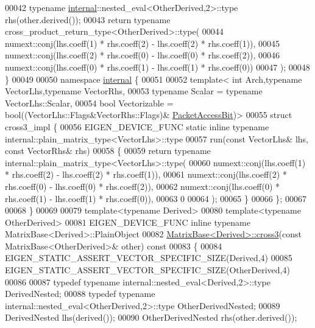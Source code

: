 \begin{DoxyCode}
00042   typename \hyperlink{namespaceinternal}{internal}::nested\_eval<OtherDerived,2>::type rhs(other.derived());
00043   return typename cross\_product\_return\_type<OtherDerived>::type(
00044     numext::conj(lhs.coeff(1) * rhs.coeff(2) - lhs.coeff(2) * rhs.coeff(1)),
00045     numext::conj(lhs.coeff(2) * rhs.coeff(0) - lhs.coeff(0) * rhs.coeff(2)),
00046     numext::conj(lhs.coeff(0) * rhs.coeff(1) - lhs.coeff(1) * rhs.coeff(0))
00047   );
00048 \}
00049 
00050 namespace \hyperlink{namespaceinternal}{internal} \{
00051 
00052 \textcolor{keyword}{template}< \textcolor{keywordtype}{int} Arch,\textcolor{keyword}{typename} VectorLhs,\textcolor{keyword}{typename} VectorRhs,
00053           \textcolor{keyword}{typename} Scalar = \textcolor{keyword}{typename} VectorLhs::Scalar,
00054           \textcolor{keywordtype}{bool} Vectorizable = bool((VectorLhs::Flags&VectorRhs::Flags)&
      \hyperlink{group__flags_ga1a306a438e1ab074e8be59512e887b9f}{PacketAccessBit})>
00055 \textcolor{keyword}{struct }cross3\_impl \{
00056   EIGEN\_DEVICE\_FUNC \textcolor{keyword}{static} \textcolor{keyword}{inline} \textcolor{keyword}{typename} internal::plain\_matrix\_type<VectorLhs>::type
00057   run(\textcolor{keyword}{const} VectorLhs& lhs, \textcolor{keyword}{const} VectorRhs& rhs)
00058   \{
00059     \textcolor{keywordflow}{return} \textcolor{keyword}{typename} internal::plain\_matrix\_type<VectorLhs>::type(
00060       numext::conj(lhs.coeff(1) * rhs.coeff(2) - lhs.coeff(2) * rhs.coeff(1)),
00061       numext::conj(lhs.coeff(2) * rhs.coeff(0) - lhs.coeff(0) * rhs.coeff(2)),
00062       numext::conj(lhs.coeff(0) * rhs.coeff(1) - lhs.coeff(1) * rhs.coeff(0)),
00063       0
00064     );
00065   \}
00066 \};
00067 
00068 \}
00069 
00079 \textcolor{keyword}{template}<\textcolor{keyword}{typename} Derived>
00080 \textcolor{keyword}{template}<\textcolor{keyword}{typename} OtherDerived>
00081 EIGEN\_DEVICE\_FUNC \textcolor{keyword}{inline} \textcolor{keyword}{typename} MatrixBase<Derived>::PlainObject
00082 \hyperlink{group___geometry___module_gaf10988c8393785423ae68a5afdf83226}{MatrixBase<Derived>::cross3}(\textcolor{keyword}{const} MatrixBase<OtherDerived>& other)\textcolor{keyword}{ const}
00083 \textcolor{keyword}{}\{
00084   EIGEN\_STATIC\_ASSERT\_VECTOR\_SPECIFIC\_SIZE(Derived,4)
00085   EIGEN\_STATIC\_ASSERT\_VECTOR\_SPECIFIC\_SIZE(OtherDerived,4)
00086 
00087   typedef typename internal::nested\_eval<Derived,2>::type DerivedNested;
00088   typedef typename internal::nested\_eval<OtherDerived,2>::type OtherDerivedNested;
00089   DerivedNested lhs(derived());
00090   OtherDerivedNested rhs(other.derived());

\end{DoxyCode}
